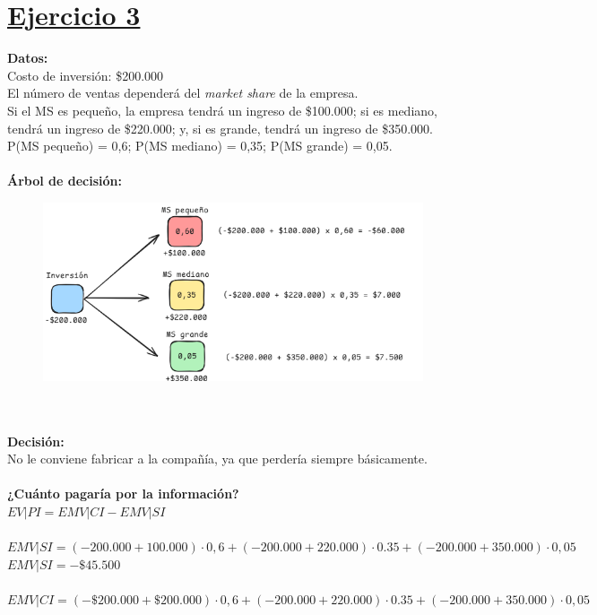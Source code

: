 \documentclass{article}
\begin{document}
    \section*{\underline{Ejercicio 3}}
        \textbf{Datos:}
        \\
        Costo de inversión: \$200.000
        \\
        El número de ventas dependerá del \textit{market share} de la empresa.
        \\
        Si el MS es pequeño, la empresa tendrá un ingreso de \$100.000; si es mediano, tendrá un ingreso de \$220.000; y, si es grande, tendrá un ingreso de \$350.000.
        \\
        P(MS pequeño) = 0,6; P(MS mediano) = 0,35; P(MS grande) = 0,05.
        \\
        \\
        \textbf{Árbol de decisión:}
        \begin{figure}[h]
            \centering
            \includegraphics[width=0.8\linewidth]{figs/p3a.png}
        \end{figure}
        \\
        \\
        \textbf{Decisión:}
        \\
        No le conviene fabricar a la compañía, ya que perdería siempre básicamente.
        \\
        \\
        \textbf{¿Cuánto pagaría por la información?}
        \\
        $EV | PI = EMV | CI - EMV | SI$
        \\
        \\
        $EMV | SI  = (-200.000 + 100.000) \cdot 0,6 + (-200.000 + 220.000) \cdot 0.35 + (-200.000+350.000) \cdot 0,05$
        \\
        $EMV | SI = -\$45.500$
        \\
        \\
        $EMV | CI = (-\$200.000 + \$200.000) \cdot 0,6 + (-200.000 + 220.000) \cdot 0.35 + (-200.000+350.000) \cdot 0,05$
\end{document}
